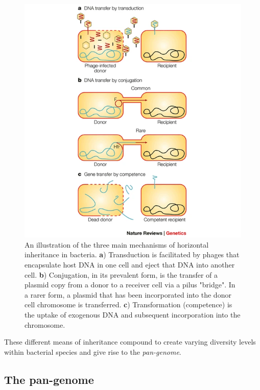 \begin{figure}
\begin{center}
\includegraphics[width=0.8\columnwidth]{Chapter0/Figs/methods-of-dna-transfer.png}
\caption{{An illustration of the three main mechanisms of horizontal inheritance in bacteria. \textbf{a}) Transduction is facilitated by phages that encapsulate host DNA in one cell and eject that DNA into another cell. \textbf{b}) Conjugation, in its prevalent form, is the transfer of a plasmid copy from a donor to a receiver cell via a pilus "bridge". In a rarer form, a plasmid that has been incorporated into the donor cell chromosome is transferred. \textbf{c}) Transformation (competence) is the uptake of exogenous DNA and subsequent incorporation into the chromosome.}
{\label{fig:horizontal-inheritance}}
}
\end{center}
\end{figure}

\noindent
These different means of inheritance compound to create varying diversity levels within bacterial species and give rise to the \emph{pan-genome}.

\subsection{The pan-genome}


